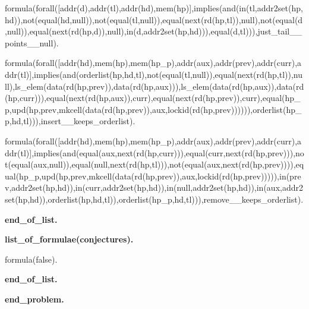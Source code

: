 formula(forall([addr(d),addr(tl),addr(hd),mem(hp)],implies(and(in(tl,addr2set(hp,hd)),not(equal(hd,null)),not(equal(tl,null)),equal(next(rd(hp,tl)),null),not(equal(d,null)),equal(next(rd(hp,d)),null),in(d,addr2set(hp,hd))),equal(d,tl))),just\_tail\_\_points\_\_null).

formula(forall([addr(hd),mem(hp),mem(hp\_p),addr(aux),addr(prev),addr(curr),addr(tl)],implies(and(orderlist(hp,hd,tl),not(equal(tl,null)),equal(next(rd(hp,tl)),null),ls\_elem(data(rd(hp,prev)),data(rd(hp,aux))),ls\_elem(data(rd(hp,aux)),data(rd(hp,curr))),equal(next(rd(hp,aux)),curr),equal(next(rd(hp,prev)),curr),equal(hp\_p,upd(hp,prev,mkcell(data(rd(hp,prev)),aux,lockid(rd(hp,prev)))))),orderlist(hp\_p,hd,tl))),insert\_\_keeps\_orderlist).

formula(forall([addr(hd),mem(hp),mem(hp\_p),addr(aux),addr(prev),addr(curr),addr(tl)],implies(and(equal(aux,next(rd(hp,curr))),equal(curr,next(rd(hp,prev))),not(equal(aux,null)),equal(null,next(rd(hp,tl))),not(equal(aux,next(rd(hp,prev)))),equal(hp\_p,upd(hp,prev,mkcell(data(rd(hp,prev)),aux,lockid(rd(hp,prev))))),in(prev,addr2set(hp,hd)),in(curr,addr2set(hp,hd)),in(null,addr2set(hp,hd)),in(aux,addr2set(hp,hd)),orderlist(hp,hd,tl)),orderlist(hp\_p,hd,tl))),remove\_\_keeps\_orderlist).

\textbf{end\_of\_list.}


\textbf{list\_of\_formulae(conjectures).}

formula(false).

\textbf{end\_of\_list.}


\large{\textbf{end\_problem.}}





